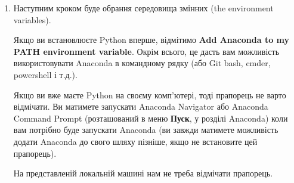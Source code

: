 \documentclass[
  letterpaper,
]{report}
\begin{document}
\begin{enumerate}
\def\labelenumi{\arabic{enumi}.}
\setcounter{enumi}{8}
\item
  Наступним кроком буде обрання середовища змінних (the environment
  variables).

  Якщо ви встановлюєте Python вперше, відмітимо \textbf{Add Anaconda to
  my PATH environment variable}. Окрім всього, це дасть вам можливість
  використовувати Anaconda в командному рядку (або Git bash, cmder,
  powershell і т.д.).

  Якщо ви вже маєте Python на своєму комп'ютері, тоді прапорець не варто
  відмічати. Ви матимете запускати Anaconda Navigator або Anaconda
  Command Prompt (розташований в меню \textbf{Пуск}, у розділі Anaconda)
  коли вам потрібно буде запускати Anaconda (ви завжди матимете
  можливість додати Anaconda до свого шляху пізніше, якщо не встановите
  цей прапорець).

  На представленій локальній машині нам не треба відмічати прапорець.
\end{enumerate}
\end{document}

